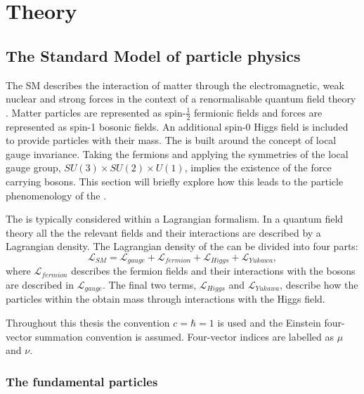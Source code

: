 \chapter{Theory}
\label{chap:theory}


\section{The Standard Model of particle physics}
\label{sec:sm}

The \acf{SM} describes the interaction of matter through the
electromagnetic, weak nuclear and strong forces in the context of a
renormalisable quantum field theory
\cite{Salam:1964ry,Glashow:1961tr,PhysRevLett.19.1264}. Matter
particles are represented as spin-$\frac{1}{2}$ fermionic fields and
forces are represented as spin-1 bosonic fields. An additional spin-0
Higgs field is included to provide particles with their mass. The \SM
is built around the concept of local gauge invariance. Taking the
fermions and applying the symmetries of the \SM local gauge group,
$SU(3)\times SU(2) \times U(1)$, implies the existence of the force
carrying bosons. This section will briefly explore how this leads to
the particle phenomenology of the \SM.

The \SM is typically considered within a Lagrangian formalism. In a
quantum field theory all the the relevant fields and their
interactions are described by a Lagrangian density. The Lagrangian
density of the \SM can be divided into four parts:
\begin{equation}
\mathcal{L}_{SM}=\mathcal{L}_{gauge}+\mathcal{L}_{fermion}+\mathcal{L}_{Higgs}+\mathcal{L}_{Yukawa},
\end{equation}
where $\mathcal{L}_{fermion}$ describes the fermion
fields and their interactions with the bosons are described in
$\mathcal{L}_{gauge}$. The final two terms, $\mathcal{L}_{Higgs}$ and
$\mathcal{L}_{Yukawa}$, describe how the particles within the \SM
obtain mass through interactions with the Higgs field.

Throughout this thesis the convention $c=\hbar = 1$ is used and the
Einstein four-vector summation convention is assumed. Four-vector indices
are labelled as $\mu$ and $\nu$.

\subsection{The fundamental particles}

